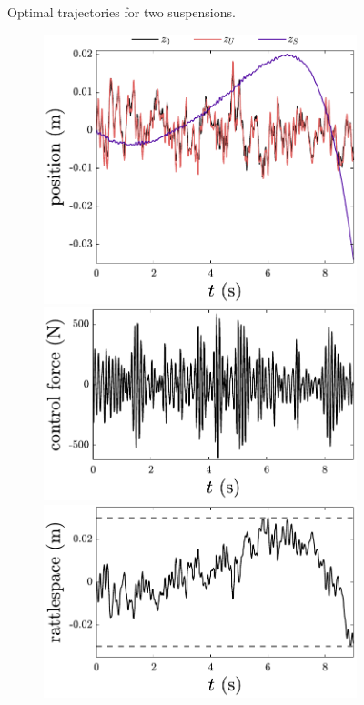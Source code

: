 \begin{figure}
\caption{Optimal trajectories for two suspensions.}

\end{figure}

\begin{figure}

\begin{subfigure}[b]{0.5\textwidth}
\centering
\includegraphics[width=\textwidth]{../ch8/figures/design4-position}
\includegraphics[width=\textwidth]{../ch8/figures/design4-control}
\includegraphics[width=\textwidth]{../ch8/figures/design4-rattlespace}

\end{subfigure}
\end{figure}

